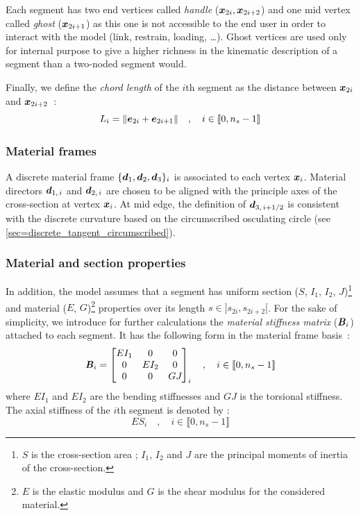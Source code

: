 Each segment has two end vertices called \emph{handle} ($\boldsymbol{x}_{2i}, \boldsymbol{x}_{2i+2}$) and one mid vertex called \emph{ghost} ($\boldsymbol{x}_{2i+1}$) as this one is not accessible to the end user in order to interact with the model (link, restrain, loading, \dots). Ghost vertices are used only for internal purpose to give a higher richness in the kinematic description of a segment than a two-noded segment would.

Finally, we define the \emph{chord length} of the $i$th segment as the distance between $\boldsymbol{x}_{2i}$ and $\boldsymbol{x}_{2i+2}$~:
\begin{equation}
	L_i = \lVert\boldsymbol{e}_{2i} + \boldsymbol{e}_{2i+1}\rVert \quad , \quad i \in \llbracket 0, n_s-1 \rrbracket
\end{equation}

\subsubsection{Material frames}
A discrete material frame $\{\boldsymbol{d}_{1}, \boldsymbol{d}_{2}, \boldsymbol{d}_{3}\}_i$ is associated to each vertex $\boldsymbol{x}_i$. Material directors $\boldsymbol{d}_{1,\,i}$ and $\boldsymbol{d}_{2,\,i}$ are chosen to be aligned with the principle axes of the cross-section at vertex $\boldsymbol{x}_i$. At mid edge, the definition of $\boldsymbol{d}_{3,\,i+1/2}$ is consistent with the discrete curvature based on the circumscribed osculating circle (see \cref{sec=discrete_tangent_circumscribed}).

\subsubsection{Material and section properties}
In addition, the model assumes that a segment has uniform section ($S$, $I_1$, $I_2$, $J$)\footnote{$S$ is the cross-section area ; $I_1$, $I_2$ and $J$ are the principal moments of inertia of the cross-section.} and material ($E$, $G$)\footnote{$E$ is the elastic modulus and $G$ is the shear  modulus for the considered material.} properties over its length $s \in ]s_{2i},s_{2i+2}[$. For the sake of simplicity, we introduce for further calculations the \emph{material stiffness matrix} ($\boldsymbol{\mathit{B}}_i$) attached to each segment. It has the following form in the material frame basis~:
\begin{equation}
	\boldsymbol{\mathit{B}}_i = \begin{bmatrix}
			EI_1		&	0		&	0		\\
			0		&	EI_{2}	&	0		\\
			0		&	0		&	GJ_{}	\\
		\end{bmatrix}_i
	\quad , \quad i \in \llbracket 0, n_s-1 \rrbracket
	\label{eq:stiffnessmatrix}
\end{equation}
where $EI_1$ and $EI_2$ are the bending stiffnesses and $GJ$ is the torsional stiffness. The axial stiffness of the $i$th segment is denoted by :
\begin{equation}
	ES_i 	\quad , \quad i \in \llbracket 0, n_s-1 \rrbracket
\end{equation}

